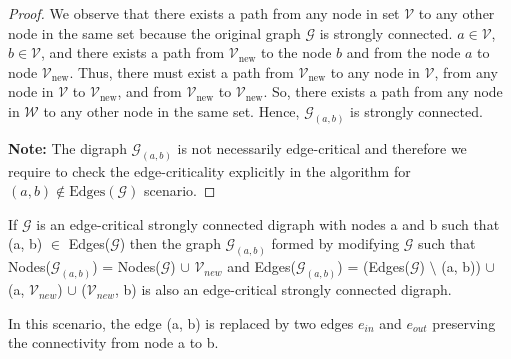 \documentclass[runningheads]{llncs}
\begin{document}
\begin{proof}
We observe that there exists a path from any node in set $\mathcal{V}$ to any other node in the same set because the original graph $\mathcal{G}$ is strongly connected. $a \in \mathcal{V}$, $b \in \mathcal{V}$, and there exists a path from $\mathcal{V}_{\text{new}}$ to the node $b$ and from the node $a$ to node $\mathcal{V}_{\text{new}}$. Thus, there must exist a path from $\mathcal{V}_{\text{new}}$ to any node in $\mathcal{V}$, from any node in $\mathcal{V}$ to $\mathcal{V}_{\text{new}}$, and from $\mathcal{V}_{\text{new}}$ to $\mathcal{V}_{\text{new}}$. So, there exists a path from any node in $\mathcal{W}$ to any other node in the same set. Hence, $\mathcal{G}_{(a,b)}$ is strongly connected.

\vspace{0.5em}
\noindent\textbf{Note:} The digraph $\mathcal{G}_{(a,b)}$ is not necessarily edge-critical and therefore we require to check the edge-criticality explicitly in the algorithm for $(a, b) \notin \text{Edges}(\mathcal{G})$ scenario.
\end{proof}

\begin{theorem}
If $\mathcal{G}$ is an edge-critical strongly connected digraph with nodes a and b such that (a, b) $\in$ Edges($\mathcal{G}$) then the graph $\mathcal{G}_{(a,b)}$ formed by modifying $\mathcal{G}$ such that Nodes($\mathcal{G}_{(a, b)}$) = Nodes($\mathcal{G}$) $\cup$ $\mathcal{V}_{new}$ and Edges($\mathcal{G}_{(a, b)}$) = (Edges($\mathcal{G}$) $\setminus$ (a, b)) $\cup$ (a, $\mathcal{V}_{new}$) $\cup$ ($\mathcal{V}_{new}$, b) is also an edge-critical strongly connected digraph.
\end{theorem}

In this scenario, the edge (a, b) is replaced by two edges $e_{in}$ and $e_{out}$ preserving the connectivity from node a to b. 
\end{document}

